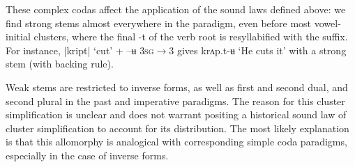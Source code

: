 \documentclass[oldfontcommands,oneside,a4paper,11pt]{article}
\newcommand{\ipa}[1]{{\phon \mbox{#1}}} %
\begin{document}
These complex codas affect the application of the sound laws defined above: we find strong stems almost everywhere in the paradigm, even before most vowel-initial clusters, where the final \ipa{-t} of the verb root is resyllabified with the suffix. For instance,  |\ipa{kript}| `cut' + \ipa{--ʉ} \textsc{3sg$\rightarrow$3} gives \ipa{krʌp.t-ʉ} `He cuts it' with a strong stem (with backing rule).

Weak stems are restricted to inverse forms, as well as first and second dual, and second plural in the past and imperative paradigms. The reason for this cluster simplification is unclear and does not warrant positing a historical sound law of cluster simplification to account for its distribution. The most likely explanation is that this allomorphy is analogical with corresponding simple coda paradigms, especially in the case of  inverse forms.
\end{document}
